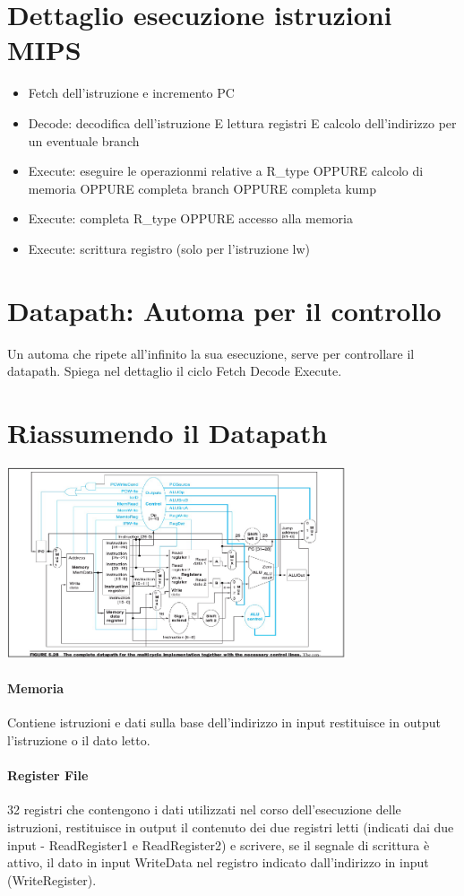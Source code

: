 \documentclass[12pt, a4paper, openany]{book}
\begin{document}
\section{Dettaglio esecuzione istruzioni MIPS}
\begin{itemize}
    \item Fetch dell'istruzione e incremento PC
    \item Decode: decodifica dell'istruzione E lettura registri E calcolo
    dell'indirizzo per un eventuale branch
    \item Execute: eseguire le operazionmi relative a R\_type OPPURE calcolo di memoria
    OPPURE completa branch OPPURE completa kump
    \item Execute: completa R\_type OPPURE accesso alla memoria
    \item Execute: scrittura registro (solo per l'istruzione lw)
\end{itemize}

\section{Datapath: Automa per il controllo}
Un automa che ripete all'infinito la sua esecuzione, serve per controllare il datapath.
Spiega nel dettaglio il ciclo Fetch Decode Execute. 

\section{Riassumendo il Datapath}
\begin{center}
    \includegraphics[width=100mm, scale=0.5]{Datapath.png}    
\end{center}
\paragraph*{Memoria} Contiene istruzioni e dati sulla base dell'indirizzo in input
restituisce in output l'istruzione o il dato letto.
\paragraph*{Register File} 32 registri che contengono i dati utilizzati nel corso
dell'esecuzione delle istruzioni, restituisce in output il contenuto dei due registri
letti (indicati dai due input - ReadRegister1 e ReadRegister2) e scrivere, se il segnale
di scrittura è attivo, il dato in input WriteData nel registro indicato dall'indirizzo
in input (WriteRegister).
\end{document}
